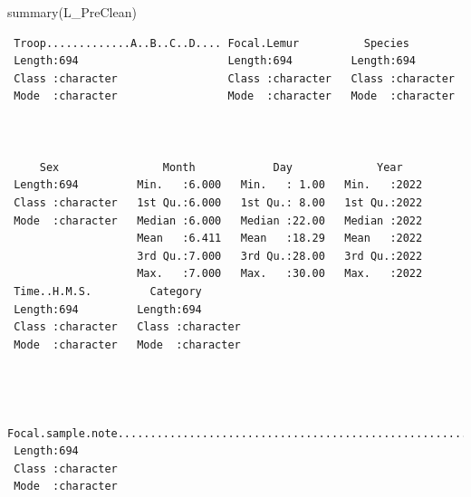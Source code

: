 \documentclass[
  letterpaper,
  DIV=11,
  numbers=noendperiod]{scrartcl}
\newenvironment{Shaded}{\begin{snugshade}}{\end{snugshade}}
\newcommand{\FunctionTok}[1]{\textcolor[rgb]{0.28,0.35,0.67}{#1}}
\newcommand{\NormalTok}[1]{\textcolor[rgb]{0.00,0.23,0.31}{#1}}
\begin{document}
\begin{Shaded}
\begin{Highlighting}[]
\FunctionTok{summary}\NormalTok{(L\_PreClean)}
\end{Highlighting}
\end{Shaded}

\begin{verbatim}
 Troop.............A..B..C..D.... Focal.Lemur          Species         
 Length:694                       Length:694         Length:694        
 Class :character                 Class :character   Class :character  
 Mode  :character                 Mode  :character   Mode  :character  
                                                                       
                                                                       
                                                                       
     Sex                Month            Day             Year     
 Length:694         Min.   :6.000   Min.   : 1.00   Min.   :2022  
 Class :character   1st Qu.:6.000   1st Qu.: 8.00   1st Qu.:2022  
 Mode  :character   Median :6.000   Median :22.00   Median :2022  
                    Mean   :6.411   Mean   :18.29   Mean   :2022  
                    3rd Qu.:7.000   3rd Qu.:28.00   3rd Qu.:2022  
                    Max.   :7.000   Max.   :30.00   Max.   :2022  
 Time..H.M.S.         Category        
 Length:694         Length:694        
 Class :character   Class :character  
 Mode  :character   Mode  :character  
                                      
                                      
                                      
 Focal.sample.note......................................................................................................................................................please.include.as.much.detail.as.possible...If.a.note.is.about.a.grooming.bout..for.example..include.stop.time.in.the.same.cell.
 Length:694                                                                                                                                                                                                                                                                                             
 Class :character                                                                                                                                                                                                                                                                                       
 Mode  :character                                                                                                                                                                                                                                                                                       
                                                                                                                                                                                                                                                                                                        

\end{verbatim}
\end{document}

